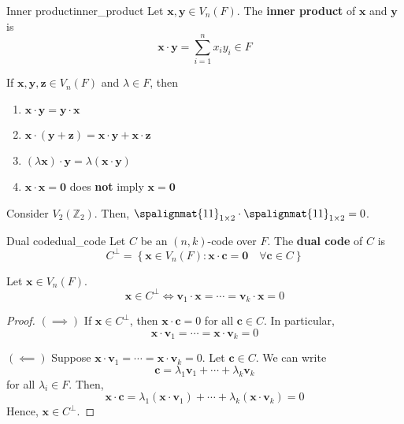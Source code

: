\begin{Definition}{Inner product}{inner_product}
    Let $ \bm{x},\bm{y}\in V_n(F) $. The \textbf{inner product}
    of $ \bm{x} $ and $ \bm{y} $ is
    \[ \bm{x}\cdot \bm{y}=\sum\limits_{i=1}^{n} x_i y_i\in F \]
\end{Definition}

\begin{Theorem}{}{}
    If $ \bm{x},\bm{y},\bm{z}\in V_n(F) $ and $ \lambda\in F $, then
    \begin{enumerate}[label=(\arabic*)]
        \item $ \bm{x}\cdot \bm{y}=\bm{y}\cdot \bm{x} $
        \item $ \bm{x}\cdot (\bm{y}+\bm{z})=\bm{x}\cdot \bm{y}+\bm{x}\cdot \bm{z} $
        \item $ (\lambda \bm{x})\cdot \bm{y}=\lambda(\bm{x}\cdot \bm{y}) $
        \item $ \bm{x}\cdot \bm{x}=\bm{0}$ does \textbf{not} imply $ \bm{x}=\bm{0} $
    \end{enumerate}
\end{Theorem}

\begin{Example}{}{}
    Consider $ V_2(\mathbb{Z}_2) $. Then,
    $ \spalignmat{1 1}_{1\times 2}\cdot\spalignmat{1 1}_{1\times 2}=0 $.
\end{Example}

\begin{Definition}{Dual code}{dual_code}
    Let $ C $ be an $ (n,k) $-code over $ F $. The \textbf{dual code}
    of $ C $ is
    \[ C^{\perp}=\left\{ \bm{x}\in V_n(F):\bm{x}\cdot \bm{c}=\bm{0}\quad\forall \bm{c}\in C\right\} \]
\end{Definition}

\begin{Theorem}{}{}
    Let $ \bm{x}\in V_n(F) $.
    \[ \bm{x}\in C^{\perp}\iff \bm{v}_1\cdot \bm{x}=\cdots =\bm{v}_k\cdot \bm{x}=0 \]
\end{Theorem}

\begin{proof}
    $ (\implies) $ If $ \bm{x}\in C^{\perp} $, then $ \bm{x}\cdot \bm{c}=0 $ for all
    $ \bm{c}\in C $. In particular,
    \[ \bm{x}\cdot \bm{v}_1=\cdots =\bm{x}\cdot \bm{v}_k=0 \]

    $ (\impliedby) $ Suppose $ \bm{x}\cdot \bm{v}_1=\cdots =\bm{x}\cdot \bm{v}_k=0 $. Let $ \bm{c}\in C $.
    We can write
    \[ \bm{c}=\lambda_1\bm{v}_1+\cdots+\lambda_k\bm{v}_k \]
    for all $ \lambda_i\in F $. Then,
    \[ \bm{x}\cdot \bm{c}=\lambda_1(\bm{x}\cdot \bm{v}_1)+\cdots+\lambda_k(\bm{x}\cdot \bm{v}_k)=0 \]
    Hence, $ \bm{x}\in C^{\perp} $.
\end{proof}

